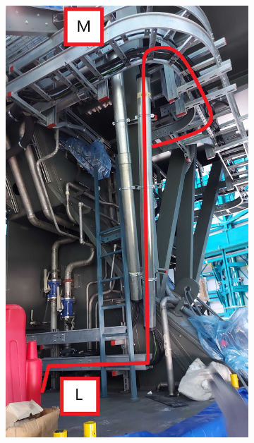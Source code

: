 \begin{figure}
  \centering
  \begin{subfigure}{0.40\textwidth}
    \centering
    \includegraphics[width=\textwidth]{images/27.jpg}
  \end{subfigure}
  \hfill
  \begin{subfigure}{0.40\textwidth}
    \centering

\end{subfigure}
\end{figure}
